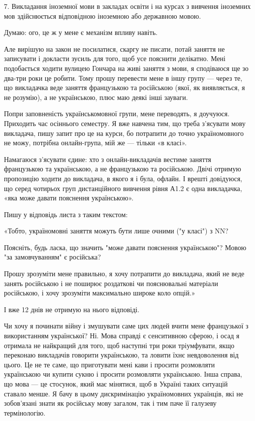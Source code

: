 7. Викладання іноземної мови в закладах освіти і на курсах з вивчення іноземних
мов здійснюється відповідною іноземною або державною мовою.

Думаю: ого, це ж у мене є механізм впливу навіть.

Але вирішую на закон не посилатися, скаргу не писати, потай заняття не
записувати і докласти зусиль для того, щоб усе пояснити делікатно. Мені
подобається ходити вулицею Гончара на живі заняття з мови, я сподіваюся ще зо
два-три роки це робити. Тому прошу перевести мене в іншу групу — через те, що
викладачка веде заняття французькою та російською (якої, як виявляється, я не
розумію), а не українською, плюс маю деякі інші зауваги.

Попри заповненість українськомовної групи, мене переводять, я доучуюся.
Приходить час осіннього семестру. Я вже навчена тим, що треба з’ясувати мову
викладача, пишу запит про це на курси, бо потрапити до точно україномовного не
можу, потрібна онлайн-група, мій же — тільки «в класі». 

Намагаюся з’ясувати єдине: хто з онлайн-викладачів вестиме заняття французькою
та українською, а не французькою та російською. Двічі отримую пропозицію ходити
до викладача, в якого я і була, офлайн. І врешті довідуюся, що серед чотирьох
груп дистанційного вивчення рівня А1.2 є одна викладачка, «яка може давати
пояснення українською».

Пишу у відповідь листа з таким текстом:

«Тобто, україномовні заняття можуть бути лише очними ("у класі") з NN?

Поясніть, будь ласка, що значить "може давати пояснення українською"? Мовою "за
замовчуванням" є російська?

Прошу зрозуміти мене правильно, я хочу потрапити до викладача, який не веде
занять російською і не поширює роздаткові чи пояснювальні матеріали російською,
і хочу зрозуміти максимально широке коло опцій.» 

І вже 12 днів не отримую на нього відповіді. 

Чи хочу я починати війну і змушувати саме цих людей вчити мене французької з
використанням української? Ні. Мова справді є сенситивною сферою, і осад я
отримала не найкращий для того, щоб наступні три роки тріумфувати, якщо
переконаю викладачів говорити українською, та ловити їхнє невдоволення від
цього. Це не те саме, що приготувати мені кави і просити розмовляти українською
чи купити сукню і просити розмовляти українською. Інша справа, що мова — це
стосунок, який має мінятися, щоб в Україні таких ситуацій ставало менше. Я бачу
в цьому дискримінацію україномовних українців, які не зобов’язані знати як
російську мову загалом, так і тим паче її галузеву термінологію.

